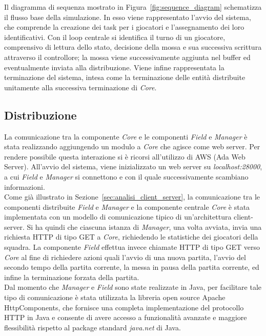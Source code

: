 Il diagramma di sequenza mostrato in Figura~\ref{fig:sequence_diagram} schematizza il flusso base della simulazione. In esso viene rappresentato l'avvio del sistema, che comprende la creazione dei task per i giocatori e l'assegnamento dei loro identificativi. Con il loop centrale si identifica il turno di un giocatore, comprensivo di lettura dello stato, decisione della mossa e sua successiva scrittura attraverso il controllore; la mossa viene successivamente aggiunta nel buffer ed eventualmente inviata alla distribuzione. Viene infine rappresentata la terminazione del sistema, intesa come la terminazione delle entità distribuite unitamente alla successiva terminazione di \emph{Core}.\\

\subsection{Distribuzione}
\label{sec:implementazione_distribuzione}

La comunicazione tra la componente \emph{Core} e le componenti \emph{Field} e \emph{Manager} è stata realizzando aggiungendo un modulo a \emph{Core} che agisce come web server. Per rendere possibile questa interazione si è ricorsi all'utilizzo di AWS (Ada Web Server). All'avvio del sistema, viene inizializzato un web server su \emph{localhost:28000}, a cui \emph{Field} e \emph{Manager} si connettono e con il quale successivamente scambiano informazioni.\\

Come già illustrato in Sezione~\ref{sec:analisi_client_server}, la comunicazione tra le componenti distribuite \emph{Field} e \emph{Manager} e la componente centrale \emph{Core} è stata implementata con un modello di comunicazione tipico di un’architettura client-server. Si ha quindi che ciascuna istanza di \emph{Manager}, una volta avviata, invia una richiesta HTTP di tipo GET a \emph{Core}, richiedendo le statistiche dei giocatori della squadra. La componente \emph{Field} effettua invece chiamate HTTP di tipo GET verso \emph{Core} al fine di richiedere azioni quali l'avvio di una nuova partita, l'avvio del secondo tempo della partita corrente, la messa in pausa della partita corrente, ed infine la terminazione forzata della partita.\\

Dal momento che \textit{Manager} e \textit{Field} sono state realizzate in Java, per facilitare tale tipo di comunicazione è stata utilizzata la libreria open source Apache HttpComponents, che fornisce una completa implementazione del protocollo HTTP in Java e consente di avere accesso a funzionalità avanzate e maggiore flessibilità rispetto al package standard \emph{java.net} di Java.\\

